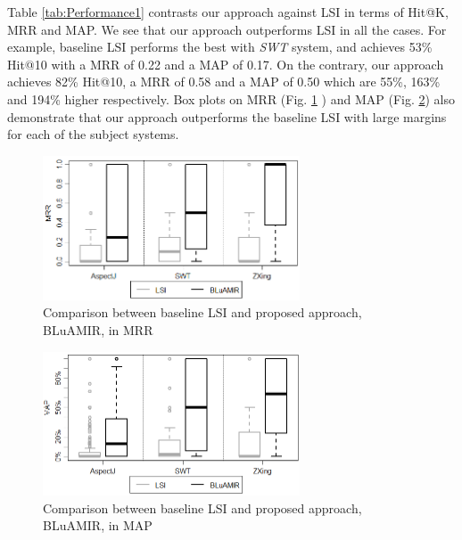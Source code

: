 \documentclass[sigconf,review,anonymous]{acmart}
\begin{document}
Table \ref{tab:Performance1} contrasts our approach against LSI in terms of Hit@K, MRR and MAP.
We see that our approach outperforms LSI in all the cases. For example, baseline LSI performs the best with \emph{SWT} system, and achieves 53\% Hit@10 with a MRR of 0.22 and a MAP of 0.17. On the contrary, our approach achieves 82\% Hit@10, a MRR of 0.58 and a MAP of 0.50 which are 55\%, 163\% and 194\% higher respectively. Box plots on MRR (Fig. \ref{box:LSI+AssoMRR} ) and MAP (Fig. \ref{box:LSI+Asso-MAP}) also demonstrate that our approach outperforms the baseline LSI with large margins for each of the subject systems.

\begin{figure}
	\centering
	\includegraphics[width=3in]{comapre-mrr}
	\vspace{-.3cm}
	\caption {Comparison between baseline LSI and proposed approach, BLuAMIR, in MRR}
	\label{box:LSI+AssoMRR}
	\vspace{-.1cm}
\end{figure}
\begin{figure}
	\centering
	\includegraphics[width=3in]{compare-map-lsi-proposed}
	\vspace{-.3cm}
	\caption {Comparison between baseline LSI and proposed approach, BLuAMIR, in MAP}
	\label{box:LSI+Asso-MAP}
\end{figure}
\end{document}
